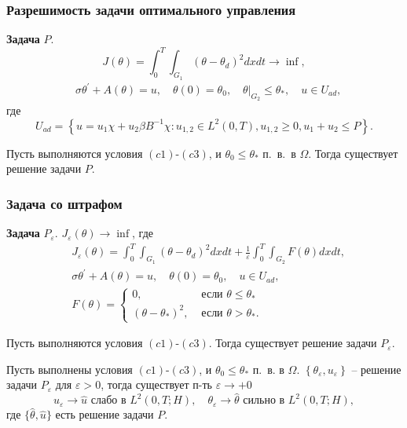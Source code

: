 \begin{frame}
    \frametitle{Разрешимость задачи оптимального управления}

    \textbf{Задача} $P$.
    \[
        J(\theta)=\int_{0}^{T}
        \int_{G_{1}}\left(\theta-\theta_{d}\right)^{2} d x d t \rightarrow \inf,
    \]
    \[
        \begin{aligned}
            & \sigma \theta^{\prime}+A(\theta)=u,
            \quad \theta(0)=\theta_{0},\left.\quad
            \theta\right|_{G_{2}} \leq \theta_{*},
            \quad u \in U_{a d},
        \end{aligned}
    \]
    где
    \[
        U_{a d}=\left\{u=u_{1} \chi+u_{2} \beta B^{-1}
        \chi: u_{1,2} \in L^{2}(0, T),\right.
        \left.u_{1,2} \geq 0, u_{1}+u_{2} \leq P\right\}.
    \]
    \begin{theorem}[3.1]
        \label{th:3_2:1}
        Пусть выполняются условия $(c1)$-$(c3)$, и $\theta_{0} \leq \theta_{*}$ п.\ в.\ в $\Omega$.
        Тогда существует решение задачи $P$.
    \end{theorem}
\end{frame}
\begin{frame}
    \frametitle{Задача со штрафом}

    \textbf{Задача} $P_{\varepsilon}$.
    $J_{\varepsilon}(\theta) \rightarrow \inf$, где
    \[
        \begin{aligned}
            & J_{\varepsilon}(\theta)=\int_{0}^{T}
            \int_{G_{1}}\left(\theta-\theta_{d}\right)^{2} dx dt
            +\frac{1}{\varepsilon} \int_{0}^{T}
            \int_{G_{2}} F(\theta) d x d t, \\
            & \sigma \theta^{\prime}+A(\theta)=u,
            \quad \theta(0)=\theta_{0}, \quad u \in U_{a d},\\
            &F(\theta)=
            \begin{cases}
                0, & \text { если } \theta \leq \theta_{*} \\
                \left(\theta-\theta_{*}\right)^{2},
                & \text { если } \theta>\theta_{*}.
            \end{cases}
        \end{aligned}
    \]
    \begin{theorem}[3.2]
        \label{th:3_2:2}
        Пусть выполняются условия $(c1)$-$(c3)$.
        Тогда существует решение задачи $P_{\varepsilon}$.
    \end{theorem}

    \begin{theorem}[3.3]
        \label{th:3_2:3}
        Пусть выполнены условия $(c1)$-$(c3)$, и $\theta_{0} \leq \theta_{*}$ п.\ в. в $\Omega$.
        $\left\{\theta_{\varepsilon}, u_{\varepsilon}\right\}$ -- решение задачи
        $P_{\varepsilon}$ для $\varepsilon>0$, тогда существует п-ть $\varepsilon \rightarrow+0$
        \[
            u_{\varepsilon} \rightarrow \widehat{u} \text { слабо в } L^{2}(0, T ; H), \quad
            \theta_{\varepsilon} \rightarrow \widehat{\theta} \text { сильно в } L^{2}(0, T ; H),
        \]
        где $\{\widehat{\theta}, \widehat{u}\}$ есть решение задачи $P$\@.
    \end{theorem}
\end{frame}

